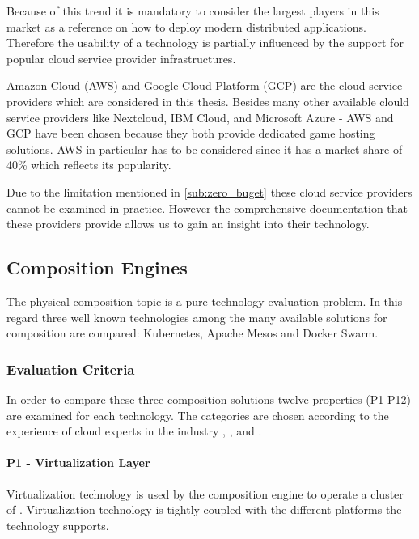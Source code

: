 Because of this trend it is mandatory to consider the largest players in this
market as a reference on how to deploy modern distributed applications. Therefore the
usability of a technology is partially influenced by the support for popular
cloud service provider infrastructures. 

Amazon Cloud (AWS) and Google Cloud Platform (GCP) are the cloud service
providers which are considered in this thesis. Besides many other available
clould service providers like Nextcloud, IBM Cloud, and Microsoft Azure - AWS
and GCP have been chosen because they both provide dedicated game hosting
solutions. AWS in particular has to be considered since it has a market share of
40\% \cite{harvey2017cloud_providers} which reflects its popularity.

Due to the limitation mentioned in \autoref{sub:zero_buget} these cloud service
providers cannot be examined in practice. However the comprehensive
documentation that these providers provide allows us to gain an insight into
their technology.

\newpage
\subsection{Composition Engines}
\label{sub:composition_engines}

The physical \ms{} composition topic is a pure technology evaluation problem.
In this regard three well known technologies among the many available solutions 
for \ms{} composition are compared: Kubernetes, Apache Mesos and Docker Swarm.

\subsubsection{Evaluation Criteria}

In order to compare these three composition solutions twelve properties
(P1-P12) are examined for each technology. The categories are chosen according
to the experience of cloud experts in the industry
\cite{toll2016cloud_expert_eval}, \cite{lerilli2012cloud_eval_criteria}, and
\cite{voras2011evaluating}.


\paragraph{P1 - Virtualization Layer}

Virtualization technology is used by the composition engine to operate a
cluster of \mss{}. Virtualization technology is tightly coupled with the
different platforms the technology supports.

